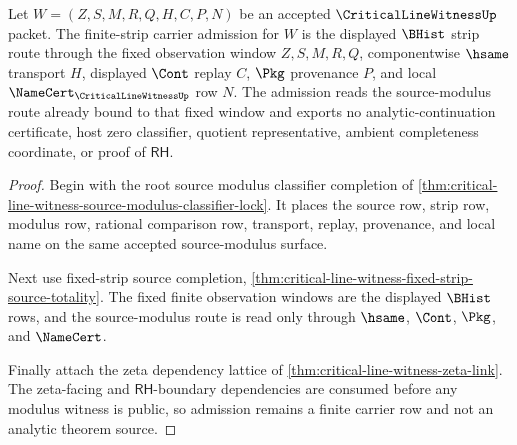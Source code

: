 \begin{theorem}
\label{thm:critical-line-witness-finite-strip-carrier-admission}
Let $W=(Z,S,M,R,Q,H,C,P,N)$ be an accepted $\CriticalLineWitnessUp$ packet. The finite-strip carrier admission for $W$ is the displayed $\BHist$ strip route through the fixed observation window $Z,S,M,R,Q$, componentwise $\hsame$ transport $H$, displayed $\Cont$ replay $C$, $\Pkg$ provenance $P$, and local $\NameCert_{\CriticalLineWitnessUp}$ row $N$. The admission reads the source-modulus route already bound to that fixed window and exports no analytic-continuation certificate, host zero classifier, quotient representative, ambient completeness coordinate, or proof of $\mathsf{RH}$.
\end{theorem}
\begin{proof}
Begin with the root source modulus classifier completion of \autoref{thm:critical-line-witness-source-modulus-classifier-lock}. It places the source row, strip row, modulus row, rational comparison row, transport, replay, provenance, and local name on the same accepted source-modulus surface.

Next use fixed-strip source completion, \autoref{thm:critical-line-witness-fixed-strip-source-totality}. The fixed finite observation windows are the displayed $\BHist$ rows, and the source-modulus route is read only through $\hsame$, $\Cont$, $\Pkg$, and $\NameCert$.

Finally attach the zeta dependency lattice of \autoref{thm:critical-line-witness-zeta-link}. The zeta-facing and $\mathsf{RH}$-boundary dependencies are consumed before any modulus witness is public, so admission remains a finite carrier row and not an analytic theorem source.
\end{proof}

